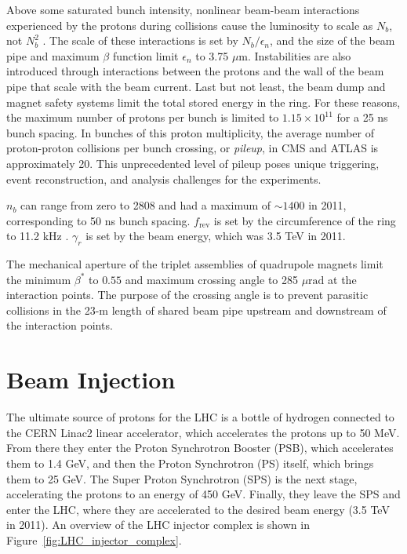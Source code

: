 \documentclass[dissertation.tex]{subfiles}
\begin{document}
Above some saturated bunch intensity, nonlinear beam-beam interactions experienced by the protons during collisions cause the luminosity to scale as $N_{b}$, not $N_{b}^{2}$ \cite{Sun:1235160}.  The scale of these interactions is set by $N_{b}/\epsilon_{n}$, and the size of the beam pipe and maximum $\beta$ function limit $\epsilon_{n}$ to 3.75 $\mu\mbox{m}$.  Instabilities are also introduced through interactions between the protons and the wall of the beam pipe that scale with the beam current.  Last but not least, the beam dump and magnet safety systems limit the total stored energy in the ring.  For these reasons, the maximum number of protons per bunch is limited to $1.15\times10^{11}$ for a 25 ns bunch spacing.  In bunches of this proton multiplicity, the average number of proton-proton collisions per bunch crossing, or \textit{pileup}, in CMS and ATLAS is approximately 20.  This unprecedented level of pileup poses unique triggering, event reconstruction, and analysis challenges for the experiments.

$n_{b}$ can range from zero to 2808 and had a maximum of $\sim1400$ in 2011, corresponding to 50 ns bunch spacing.  $f_{\mathrm{rev}}$ is set by the circumference of the ring to 11.2 kHz \cite{Bruning:782076}.  $\gamma_{r}$ is set by the beam energy, which was 3.5 TeV in 2011.

The mechanical aperture of the triplet assemblies of quadrupole magnets limit the minimum $\beta^{*}$ to $0.55$ \cite{Bruning:782076} and maximum crossing angle to 285 $\mu\mbox{rad}$ \cite{Bruning:782076} at the interaction points.  The purpose of the crossing angle is to prevent parasitic collisions in the 23-m length of shared beam pipe upstream and downstream of the interaction points.

\section{Beam Injection}
\label{sec:Beam Injection}

The ultimate source of protons for the LHC is a bottle of hydrogen connected to the CERN Linac2 linear accelerator, which accelerates the protons up to 50 MeV.  From there they enter the Proton Synchrotron Booster (PSB), which accelerates them to 1.4 GeV, and then the Proton Synchrotron (PS) itself, which brings them to 25 GeV.  The Super Proton Synchrotron (SPS) is the next stage, accelerating the protons to an energy of 450 GeV.  Finally, they leave the SPS and enter the LHC, where they are accelerated to the desired beam energy (3.5 TeV in 2011).  An overview of the LHC injector complex is shown in Figure~\ref{fig:LHC_injector_complex}.
\end{document}

